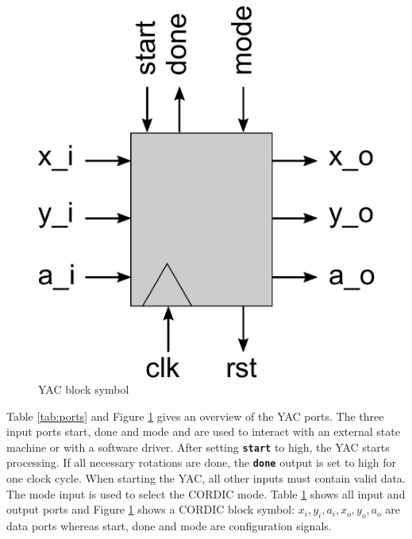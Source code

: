 \documentclass[a4paper, 12pt, notitlepage]{report}
\newcommand{\signal}[1]{{\textbf{\tt#1}}}
\begin{document}
\begin{figure}[p]
\centering
   \includegraphics{figs/block_symbol.pdf}
   \caption{YAC block symbol}
   \label{fig:ports}
\end{figure}
Table \ref{tab:ports} and Figure \ref{fig:ports} gives an overview
of the YAC ports.
The three input ports start, done and mode and are used to interact
with an external state machine or with a software driver.
After setting \signal{start} to high, the YAC starts processing.
If all necessary rotations are done, the \signal{done} output is set to 
high for one clock cycle.
When starting the YAC, all other inputs must contain valid data.
The mode input is used to select the CORDIC mode.
Table \ref{fig:ports} shows all input and output ports and Figure 
\ref{fig:ports} shows a CORDIC block symbol: $x_i, y_i, a_i, x_o, y_o, a_o$
are data ports whereas start, done and mode are configuration signals.
\end{document}
